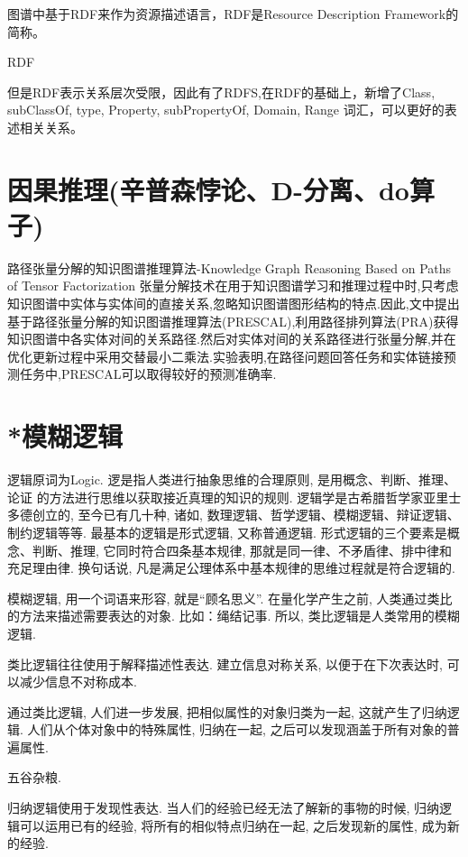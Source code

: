 图谱中基于RDF来作为资源描述语言，RDF是Resource Description Framework的简称。

RDF

但是RDF表示关系层次受限，因此有了RDFS,在RDF的基础上，新增了Class, subClassOf, type, Property, subPropertyOf, Domain, Range 词汇，可以更好的表述相关关系。
\section{因果推理(辛普森悖论、D-分离、do算子)}

路径张量分解的知识图谱推理算法-Knowledge Graph Reasoning Based on Paths of Tensor Factorization
张量分解技术在用于知识图谱学习和推理过程中时,只考虑知识图谱中实体与实体间的直接关系,忽略知识图谱图形结构的特点.因此,文中提出基于路径张量分解的知识图谱推理算法(PRESCAL),利用路径排列算法(PRA)获得知识图谱中各实体对间的关系路径.然后对实体对间的关系路径进行张量分解,并在优化更新过程中采用交替最小二乘法.实验表明,在路径问题回答任务和实体链接预测任务中,PRESCAL可以取得较好的预测准确率.
\section{*模糊逻辑}
逻辑原词为Logic. 逻是指人类进行抽象思维的合理原则, 是用概念、判断、推理、论证 的方法进行思维以获取接近真理的知识的规则. 逻辑学是古希腊哲学家亚里士多德创立的, 至今已有几十种, 诸如, 数理逻辑、哲学逻辑、模糊逻辑、辩证逻辑、制约逻辑等等. 最基本的逻辑是形式逻辑, 又称普通逻辑. 形式逻辑的三个要素是概念、判断、推理, 它同时符合四条基本规律, 那就是同一律、不矛盾律、排中律和充足理由律. 换句话说, 凡是满足公理体系中基本规律的思维过程就是符合逻辑的.

模糊逻辑, 用一个词语来形容, 就是“顾名思义”. 在量化学产生之前, 人类通过类比的方法来描述需要表达的对象. 比如：绳结记事. 所以, 类比逻辑是人类常用的模糊逻辑.

类比逻辑往往使用于解释描述性表达. 建立信息对称关系, 以便于在下次表达时, 可以减少信息不对称成本.

通过类比逻辑, 人们进一步发展, 把相似属性的对象归类为一起, 这就产生了归纳逻辑. 人们从个体对象中的特殊属性, 归纳在一起, 之后可以发现涵盖于所有对象的普遍属性.
\begin{example}
  五谷杂粮.
\end{example}

归纳逻辑使用于发现性表达. 当人们的经验已经无法了解新的事物的时候, 归纳逻辑可以运用已有的经验, 将所有的相似特点归纳在一起, 之后发现新的属性, 成为新的经验.

